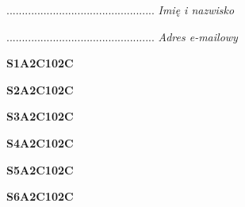 \begin{turn}{90}\begin{minipage}{\linewidth} \vspace{20mm} ................................................  \textit{Imię i nazwisko}\end{minipage}\end{turn}

\begin{turn}{90}\begin{minipage}{\linewidth} \vspace{20mm} ................................................  \textit{Adres e-mailowy}\end{minipage}\end{turn}

\begin{turn}{90}\huge \begin{minipage}{\linewidth} \vspace{10mm}\textbf{S1A2C102C}\end{minipage}\end{turn}

\begin{turn}{90}\huge \begin{minipage}{\linewidth} \vspace{10mm}\textbf{S2A2C102C}\end{minipage}\end{turn}

\begin{turn}{90}\huge \begin{minipage}{\linewidth} \vspace{10mm}\textbf{S3A2C102C}\end{minipage}\end{turn}

\begin{turn}{90}\huge \begin{minipage}{\linewidth} \vspace{10mm}\textbf{S4A2C102C}\end{minipage}\end{turn}

\begin{turn}{90}\huge \begin{minipage}{\linewidth} \vspace{10mm}\textbf{S5A2C102C}\end{minipage}\end{turn}

\begin{turn}{90}\huge \begin{minipage}{\linewidth} \vspace{10mm}\textbf{S6A2C102C}\end{minipage}\end{turn}

